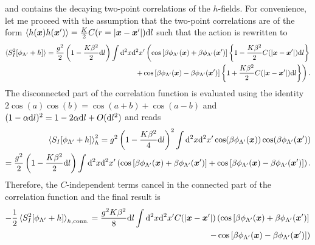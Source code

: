 and contains the decaying two-point correlations of the $h$-fields.
For convenience, let me proceed with the assumption that the two-point correlations are of the form $\braket{h({\bm x})h({\bm x'})} = \frac K2 C(r=|{\bm x}-{\bm x'}|)\mathrm d l$ such that the action is rewritten to
\begin{align}
    \braket{S^2_I[\phi_{\Lambda'}+h]}=\frac{g^2}2\left( 1 - \frac{K\beta^2}2\mathrm d l \right)\int\mathrm d^2x\mathrm d^2x'
    \left(
        \cos\left[ \beta\phi_{\Lambda'}({\bm x})+\beta\phi_{\Lambda'}({\bm x'}) \right]\left\{ 1-\frac{K\beta^2}2C(|{\bm x}-{\bm x'}|)\mathrm d l \right\}
        \right.\\
        \left.+
        \cos\left[ \beta\phi_{\Lambda'}({\bm x})-\beta\phi_{\Lambda'}({\bm x'}) \right]\left\{ 1+\frac{K\beta^2}2C(|{\bm x}-{\bm x'}|)\mathrm d l \right\}
    \right).
\end{align}
The disconnected part of the correlation function is evaluated using the identity $2\cos(a)\cos(b)=\cos(a+b)+\cos(a-b)$ and $(1-\alpha\mathrm d l)^2 = 1-2\alpha\mathrm d l + O(\mathrm d l^2)$ and reads
\begin{align}
    \braket{S_I[\phi_{\Lambda'}+h]}_h^2
    = g^2\left( 1 - \frac{K\beta^2}4\mathrm d l \right)^2\int\mathrm d^2x\mathrm d^2x'\cos(\beta \phi_{\Lambda'}({\bm x}))\cos(\beta \phi_{\Lambda'}({\bm x'}))
    \\
    = \frac{g^2}2\left( 1 - \frac{K\beta^2}2\mathrm d l \right)\int\mathrm d^2x\mathrm d^2x'
        \left(
            \cos\left[ \beta \phi_{\Lambda'}({\bm x})+\beta \phi_{\Lambda'}({\bm x'}) \right]
            +
            \cos\left[ \beta \phi_{\Lambda'}({\bm x})-\beta \phi_{\Lambda'}({\bm x'}) \right]
        \right).
\end{align}
Therefore, the $C$-independent terms cancel in the connected part of the correlation function and the final result is
\begin{align}
    -\frac12\braket{S^2_I[\phi_{\Lambda'}+h]}_{h,{\rm conn.}} = \frac{g^2K\beta^2}8\mathrm d l\int\mathrm d^2x\mathrm d^2x'
    C(|{\bm x}-{\bm x'}|)
    \left(
        \cos\left[ \beta\phi_{\Lambda'}({\bm x})+\beta\phi_{\Lambda'}({\bm x'}) \right]
        \right.
        \\
        \left.-
        \cos\left[ \beta\phi_{\Lambda'}({\bm x})-\beta\phi_{\Lambda'}({\bm x'}) \right]
    \right)
\end{align}

